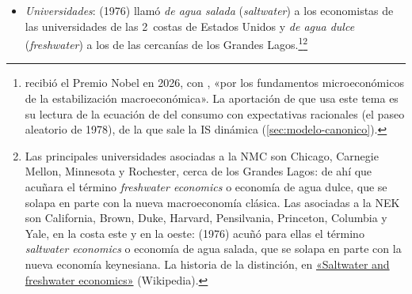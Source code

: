\documentclass[11pt]{article}
\begin{document}
\begin{itemize}
\begin{itemize}
  \item \emph{Universidades}:  (1976) llamó \emph{de agua salada} (\emph{saltwater}) a los economistas de las universidades de las 2~costas de Estados Unidos y \emph{de agua dulce} (\emph{freshwater}) a los de las cercanías de los Grandes Lagos\nocite{Hall2026Perfil}.\footnote{ recibió el Premio Nobel en 2026, con , «por los fundamentos microeconómicos de la estabilización macroeconómica»\nocite{Nobel2026Prensa}. La aportación de  que usa este tema es su lectura de la ecuación de  del consumo con expectativas racionales (el paseo aleatorio de 1978), de la que sale la IS dinámica (\ref{sec:modelo-canonico}).}\footnote{Las principales universidades asociadas a la NMC son Chicago, Carnegie Mellon, Minnesota y Rochester, cerca de los Grandes Lagos: de ahí que  acuñara el término \emph{freshwater economics} o economía de agua dulce, que se solapa en parte con la nueva macroeconomía clásica. Las asociadas a la NEK son California, Brown, Duke, Harvard, Pensilvania, Princeton, Columbia y Yale, en la costa este y en la oeste:  (1976) acuñó para ellas el término \emph{saltwater economics} o economía de agua salada, que se solapa en parte con la nueva economía keynesiana.\nocite{WojcikKrestonMcGill2012} La historia de la distinción, en \href{https://en.wikipedia.org/wiki/Saltwater_and_freshwater_economics\#History_of_the_saltwater\%E2\%80\%93freshwater_dichotomy}{«Saltwater and freshwater economics»} (Wikipedia).}


\end{itemize}
\end{itemize}
\end{document}
